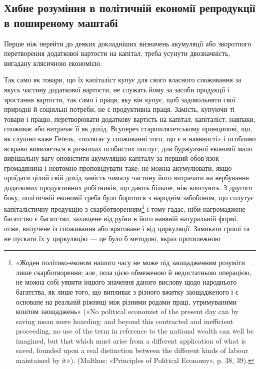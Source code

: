 
\subsection{Хибне розуміння в політичній економії репродукції
в поширеному маштабі
}

Перше ніж перейти до деяких докладніших визначень акумуляції
або зворотпого перетворення додаткової вартости на капітал,
треба усунути двозначність, вигадану клясичною економією.

Так само як товари, що їх капіталіст купує для свого власного
споживання за якусь частину додаткової вартости, не служать
йому за засоби продукції і зростання вартости, так само і праця,
яку він купує, щоб задовольняти свої природні й соціяльні
потреби, не є продуктивна праця. Замість, купуючи ті товари
і працю, перетворювати додаткову вартість на капітал, капіталіст,
навпаки, споживає або витрачає її як дохід. Всупереч
старошляхетському принципові, що, як слушно каже Геґель,
«полягає у споживанні того, що є в наявності» і особливо яскраво
виявляється в розкошах особистих послуг, для буржуазної економії
мало вирішальну вагу оповістити акумуляцію капіталу за
перший обов’язок громадянина і невтомно проповідувати таке:
не можна акумулювати, якщо проїдати цілий свій дохід замість
чималу частину його витрачати на вербування додаткових продуктивних
робітників, що дають більше, ніж коштують. З другого
боку, політичній економії треба було боротися з народнім
забобоном, що сплутує капіталістичну продукцію з скарботворенням\footnote{
«Жоден політико-економ нашого часу не може під заощадженням
розуміти лише скарботворення; але, поза цією обмеженою й недостатньою
операцією, не можна собі уявити іншого значення даного
вислову щодо народнього багатства, як лише того, що випливає з різного
вжитку заощадженого і є основане на реальній ріжниці між різними
родами праці, утримуваними коштом заощаджень» («No political
economist of the present day can by saving mean mere hoarding: and
beyond this contracted and inefficient proceeding, no use of the term in reference
to the national wealth can well be imagined, but that which must
arise from a different application of what is saved, founded upon a real
distinction between the different kinds of labour maintained by it»).
(Malthus: «Principles of Political Economy», p. 38, 39).
} і тому гадає, ніби нагромаджене багатство є багатство, захищене
від руїни в його наявній натуральній формі, отже, вилучене
із споживання або врятоване і від циркуляції. Замикати гроші
та не пускати їх у циркуляцію — це було б методою, якраз протилежною
